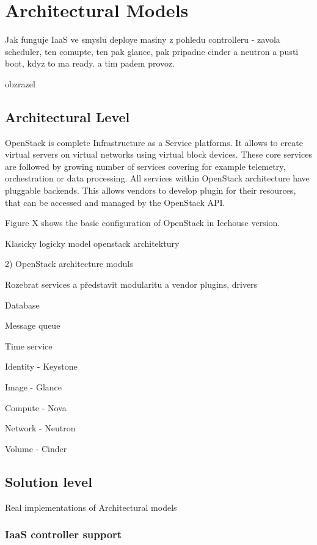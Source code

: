 
\section{Architectural Models}

Jak funguje IaaS ve smyslu deploye masiny z pohledu controlleru - zavola scheduler, ten comupte, ten pak glance, pak pripadne cinder a neutron a pusti boot, kdyz to ma ready. a tim padem provoz.

obzrazel

\subsection{Architectural Level}

OpenStack is complete Infrastructure as a Service platforms. It allows to create virtual servers on virtual networks using virtual block devices. These core services are followed by growing number of services covering for example telemetry, orchestration or data processing. All services within OpenStack architecture have pluggable backends. This allows vendors to develop plugin for their resources, that can be accessed and managed by the OpenStack API.

Figure X shows the basic configuration of OpenStack in Icehouse version.

Klasicky logicky model openstack architektury

2) OpenStack architecture moduls

Rozebrat services a představit modularitu a vendor plugins, drivers

Database

Message queue

Time service

Identity - Keystone

Image - Glance

Compute - Nova

Network - Neutron

Volume - Cinder

\subsection{Solution level}

Real implementations of Architectural models

\subsubsection{IaaS controller support}

